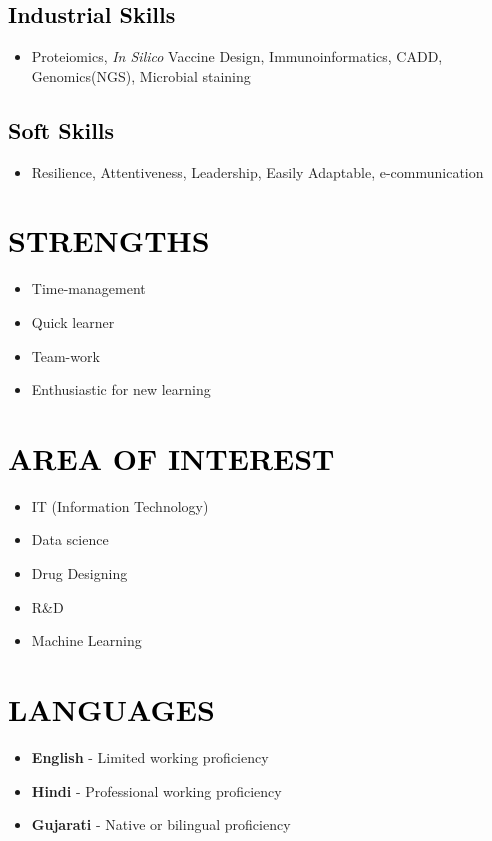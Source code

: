 \documentclass[a4paper,10pt]{article}
\begin{document}
\begin{multicols}{2}
\subsection*{\textcolor{black}{Industrial Skills}}
\begin{itemize}
    \item Proteiomics, \textit{In Silico} Vaccine Design, Immunoinformatics, CADD, Genomics(NGS), Microbial staining
\end{itemize}

\subsection*{\textcolor{black}{Soft Skills}}
\begin{itemize}
    \item Resilience, Attentiveness, Leadership, Easily Adaptable, e-communication
\end{itemize}


\section*{\textcolor{black}{STRENGTHS}}
\begin{itemize}
    \item Time-management
    \item Quick learner
    \item Team-work
    \item Enthusiastic for new learning
\end{itemize}

\section*{\textcolor{black}{AREA OF INTEREST}}
\begin{itemize}
    \item IT (Information Technology)
    \item Data science
    \item Drug Designing
    \item R\&D
    \item Machine Learning
\end{itemize}

\section*{\textcolor{black}{LANGUAGES}}
\begin{itemize}
    \item \textbf{English} - Limited working proficiency
    \item \textbf{Hindi} - Professional working proficiency
    \item \textbf{Gujarati} - Native or bilingual proficiency
\end{itemize}


\end{multicols}
\end{document}
